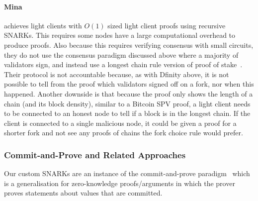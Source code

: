 \paragraph{Mina~\cite{mina}} achieves light clients with $O(1)$ sized light client proofs using recursive SNARKs. This requires some nodes have a large computational overhead to produce proofs. Also because this requires verifying consensus with small circuits, they do not use the consensus paradigm 
discussed above where a majority of validators sign, and instead use a longest chain rule version of proof of stake~\cite{mina}. 
Their protocol is not accountable because, as with Dfinity above, it is not possible to tell from the proof which validators signed off on a fork, nor when this happened. 
Another downside is that because the proof only shows the length of a chain (and its block density), similar to a Bitcoin SPV proof, a light client needs to be 
connected to an honest node to tell if a block is in the longest chain. If the client is connected to a single malicious node, it could be given a proof for a 
shorter fork and not see any proofs of chains the fork choice rule would prefer.
\vspace{-0.03cm}
\subsubsection{Commit-and-Prove and Related Approaches}
\label{sec:commit_prove}

\noindent Our custom SNARKs are an instance of the commit-and-prove paradigm~\cite{KilianPhD,CLOS02,CP_proposal,HP_paper,CP_paper} 
which is a generalisation for zero-knowledge proofs/arguments in which the prover proves statements about values that are committed.\\

\begin{comment}
In practice, commit-and-prove systems (for short, CP) can be used to compress a large data structure and then prove something about its 
content (e.g., polynomial commitments~\cite{KZG_10}, vector commitments~\cite{vector_commitment_1}, accumulators~\cite{first_accumulator}). 
CP schemes can also be used to decouple the publishing of commitments to some data from the proof generation: each of these actions may be 
performed by different parties or entities~\cite{zkp_reference}. Finally, commitments can be used to make different proof systems 
interoperable~\cite{CP_paper,interoperability_2}. Our SNARKs have properties from the first two categories, however we could not 
have simply re-used an existing argument system: by designing custom circuits and SNARKs, we ensured improved efficiency for our use cases. 
\end{comment}
\vspace{-0.1in}

